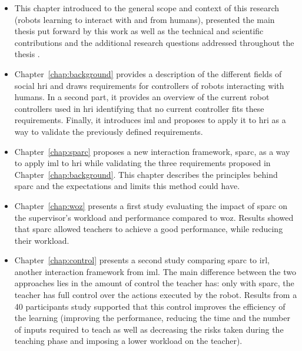 \begin{itemize}
	\item This chapter introduced to the general scope and context of this research (robots learning to interact with and from humans), presented the main thesis put forward by this work as well as the technical and scientific contributions and the additional research questions addressed throughout the thesis .

	\item Chapter~\ref{chap:background} provides a description of the different fields of social \gls{hri} and draws requirements for controllers of robots interacting with humans. In a second part, it provides an overview of the current robot controllers used in \gls{hri} identifying that no current controller fits these requirements. Finally, it introduces \gls{iml} and proposes to apply it to \gls{hri} as a way to validate the previously defined requirements.
	
	\item Chapter~\ref{chap:sparc} proposes a new interaction framework, \gls{sparc}, as a way to apply \gls{iml} to \gls{hri} while validating the three requirements proposed in Chapter~\ref{chap:background}. This chapter describes the principles behind \gls{sparc} and the expectations and limits this method could have.
	
	\item Chapter~\ref{chap:woz} presents a first study evaluating the impact of \gls{sparc} on the supervisor's workload and performance compared to \gls{woz}. Results showed that \gls{sparc} allowed teachers to achieve a good performance, while reducing their workload.
	
	\item Chapter~\ref{chap:control} presents a second study comparing \gls{sparc} to \gls{irl}, another interaction framework from \gls{iml}. The main difference between the two approaches lies in the amount of control the teacher has: only with \gls{sparc}, the teacher has full control over the actions executed by the robot. Results from a 40 participants study supported that this control improves the efficiency of the learning (improving the performance, reducing the time and the number of inputs required to teach as well as decreasing the risks taken during the teaching phase and imposing a lower workload on the teacher).
	

\end{itemize}

